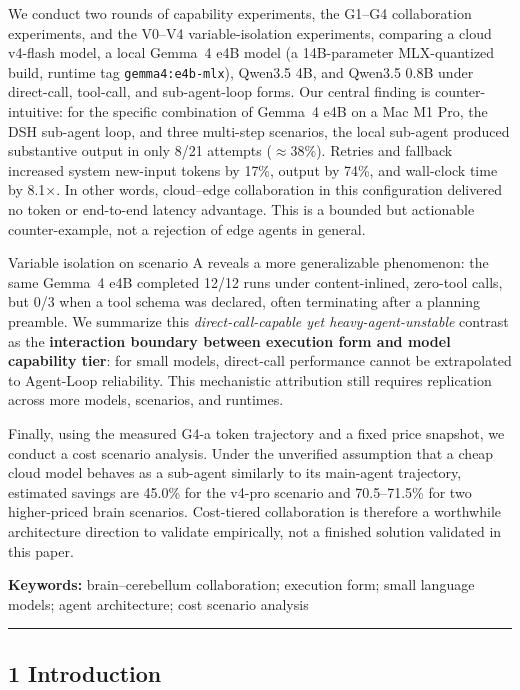 \documentclass[
]{article}
\begin{document}
We conduct two rounds of capability experiments, the G1--G4 collaboration experiments, and the V0--V4 variable-isolation experiments, comparing a cloud v4-flash model, a local Gemma~4 e4B model (a 14B-parameter MLX-quantized build, runtime tag \texttt{gemma4:e4b-mlx}), Qwen3.5 4B, and Qwen3.5 0.8B under direct-call, tool-call, and sub-agent-loop forms. Our central finding is counter-intuitive: for the specific combination of Gemma~4 e4B on a Mac M1 Pro, the DSH sub-agent loop, and three multi-step scenarios, the local sub-agent produced substantive output in only 8/21 attempts ($\approx$38\%). Retries and fallback increased system new-input tokens by 17\%, output by 74\%, and wall-clock time by 8.1$\times$. In other words, cloud--edge collaboration in this configuration delivered no token or end-to-end latency advantage. This is a bounded but actionable counter-example, not a rejection of edge agents in general.

Variable isolation on scenario A reveals a more generalizable phenomenon: the same Gemma~4 e4B completed 12/12 runs under content-inlined, zero-tool calls, but 0/3 when a tool schema was declared, often terminating after a planning preamble. We summarize this \emph{direct-call-capable yet heavy-agent-unstable} contrast as the \textbf{interaction boundary between execution form and model capability tier}: for small models, direct-call performance cannot be extrapolated to Agent-Loop reliability. This mechanistic attribution still requires replication across more models, scenarios, and runtimes.

Finally, using the measured G4-a token trajectory and a fixed price snapshot, we conduct a cost scenario analysis. Under the unverified assumption that a cheap cloud model behaves as a sub-agent similarly to its main-agent trajectory, estimated savings are 45.0\% for the v4-pro scenario and 70.5--71.5\% for two higher-priced brain scenarios. Cost-tiered collaboration is therefore a worthwhile architecture direction to validate empirically, not a finished solution validated in this paper.

\textbf{Keywords:} brain--cerebellum collaboration; execution form; small language models; agent architecture; cost scenario analysis

\begin{center}\rule{0.5\linewidth}{0.5pt}\end{center}


\subsection{1 Introduction}
\end{document}
